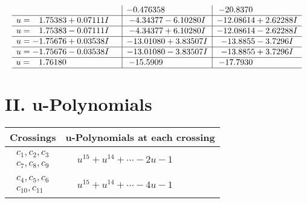 \documentclass[1p]{elsarticle_modified}
\theoremstyle{definition}
\begin{document}
$$\begin{array}{c|c|c}
 & -0.476358\phantom{ +0.000000I} & -20.8370\phantom{ +0.000000I} \\ \hline\begin{aligned}
u &= \phantom{-}1.75383 + 0.07111 I\end{aligned}
 & -4.34377 - 6.10280 I & -12.08614 + 2.62288 I \\ \hline\begin{aligned}
u &= \phantom{-}1.75383 - 0.07111 I\end{aligned}
 & -4.34377 + 6.10280 I & -12.08614 - 2.62288 I \\ \hline\begin{aligned}
u &= -1.75676 + 0.03538 I\end{aligned}
 & -13.01080 + 3.83507 I & -13.8855 - 3.7296 I \\ \hline\begin{aligned}
u &= -1.75676 - 0.03538 I\end{aligned}
 & -13.01080 - 3.83507 I & -13.8855 + 3.7296 I \\ \hline\begin{aligned}
u &= \phantom{-}1.76180\phantom{ +0.000000I}\end{aligned}
 & -15.5909\phantom{ +0.000000I} & -17.7930\phantom{ +0.000000I}\\
 \hline 
 \end{array}$$\newpage
\newpage\renewcommand{\arraystretch}{1}
\centering \section*{ II. u-Polynomials}
\begin{tabular}{m{50pt}|m{274pt}}
Crossings & \hspace{64pt}u-Polynomials at each crossing \\
\hline $$\begin{aligned}c_{1},c_{2},c_{3}\\c_{7},c_{8},c_{9}\end{aligned}$$&$\begin{aligned}
&u^{15}+u^{14}+\cdots-2 u-1
\end{aligned}$\\
\hline $$\begin{aligned}c_{4},c_{5},c_{6}\\c_{10},c_{11}\end{aligned}$$&$\begin{aligned}
&u^{15}+u^{14}+\cdots-4 u-1
\end{aligned}$\\
\hline
\end{tabular}\newpage\renewcommand{\arraystretch}{1}
\end{document}
